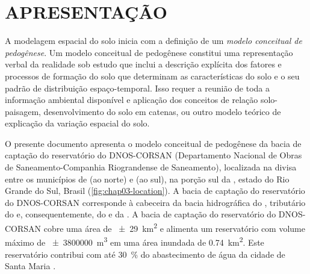 \formatchapter

\section{APRESENTAÇÃO}
\label{sec:chap03-apresentacao}


A modelagem espacial do solo inicia com a definição de um \emph{modelo conceitual de pedogênese}. Um modelo 
conceitual de pedogênese constitui uma representação verbal da realidade sob estudo que inclui a descrição 
explícita dos fatores e processos de formação do solo que determinam as características do solo e o seu padrão 
de distribuição espaço-temporal. Isso requer a reunião de toda a informação ambiental disponível e aplicação 
dos conceitos de relação solo-paisagem, desenvolvimento do solo em catenas, ou outro modelo teórico de 
explicação da variação espacial do solo.

O presente documento apresenta o modelo conceitual de pedogênese da bacia de captação do reservatório do 
DNOS-CORSAN (Departamento Nacional de Obras de Saneamento-Companhia Riograndense de Saneamento), localizada na 
divisa entre os municípios de \itaara{} (ao norte) e \santamaria{} (ao sul), na porção sul da \baciaparana{}, 
estado do Rio Grande do Sul, Brasil (\autoref{fig:chap03-location}). A bacia de captação do reservatório do 
DNOS-CORSAN corresponde à cabeceira da bacia hidrográfica do \riovacacaimirim{}, tributário do \riojacui{} e, 
consequentemente, do \rioguaiba{} e da \lagoadospatos{}. A bacia de captação do reservatório do DNOS-CORSAN 
cobre uma área de \SI{\pm29}{\square\kilo\metre} e alimenta um reservatório com volume máximo de 
\SI{\pm3800000}{\cubic\metre} em uma área inundada de \SI{0,74}{\square\kilo\metre}. Este reservatório 
contribui com até \SI{30}{\percent} do abastecimento de água da cidade de Santa Maria \cite{Dias2003, 
DillEtAl2004, Miguel2010}.


